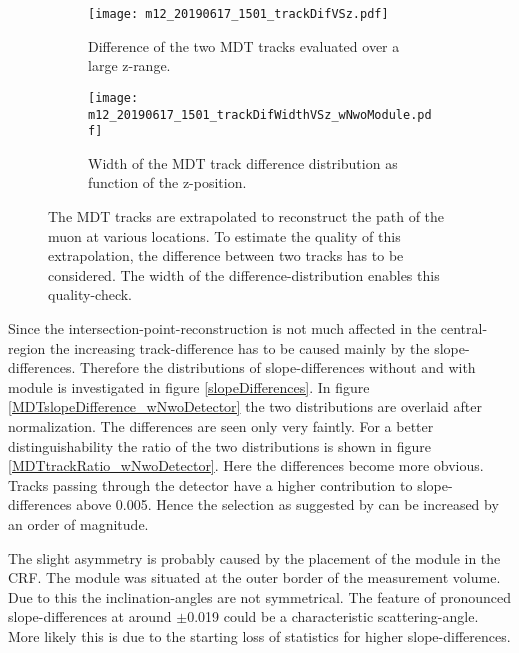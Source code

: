 \documentclass[
twoside,            %
BCOR1.4cm,          %
10pt,               %
headings=normal,    %
headsepline,        %
clearplainpage,		%
final,              %
div=14,
open=right,
bibliography=toc
]{scrreprt}
\begin{document}
\begin{figure}[!h]
	\begin{subfigure}[b]{0.48\textwidth}
		\centering
		\texttt{[image: m12\_20190617\_1501\_trackDifVSz.pdf]}
		\caption{Difference of the two MDT tracks evaluated over a large z-range.}
		\label{m12_20190617_1501_trackDifVSz} 
	\end{subfigure}
	\hfill
	\begin{subfigure}[b]{0.48\textwidth}
		\centering
		\texttt{[image: m12\_20190617\_1501\_trackDifWidthVSz\_wNwoModule.pdf]}
		\caption{Width of the MDT track difference distribution as function of the z-position.}
		\label{m12_20190617_1501_trackDifWidthVSz_wNwoModule} 
	\end{subfigure}
	\vspace{-2mm}
	\caption{
		The MDT tracks are extrapolated to reconstruct the path of the muon at various locations.
		To estimate the quality of this extrapolation, the difference between two tracks has to be considered.
		The width of the difference-distribution enables this quality-check.
	}
	\label{trackDifference}
\end{figure}

Since the intersection-point-reconstruction is not much affected in the central-region the increasing track-difference has to be caused mainly by the slope-differences.
Therefore the distributions of slope-differences without and with module is investigated in figure \ref{slopeDifferences}.
In figure \ref{MDTslopeDifference_wNwoDetector} the two distributions are overlaid after normalization.
The differences are seen only very faintly.
For a better distinguishability the ratio of the two distributions is shown in figure \ref{MDTtrackRatio_wNwoDetector}.
Here the differences become more obvious.
Tracks passing through the detector have a higher contribution to slope-differences above 0.005.
Hence the selection as suggested by \cite{loeselThesis} can be increased by an order of magnitude.

The slight asymmetry is probably caused by the placement of the module in the CRF.
The module was situated at the outer border of the measurement volume.
Due to this the inclination-angles are not symmetrical.
The feature of pronounced slope-differences at around $\pm$0.019 could be a characteristic scattering-angle.
More likely this is due to the starting loss of statistics for higher slope-differences.
\end{document}
